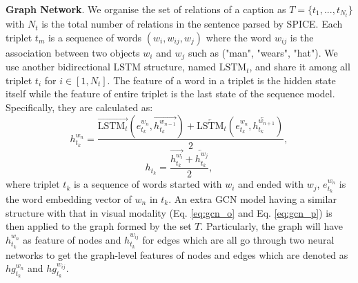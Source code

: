 \documentclass{IOS-Book-Article}
\begin{document}
\textbf{Graph Network}. We organise the set of relations of a caption as $T = \{t_1, ..., t_{N_t}\}$ with $N_t$ is the total number of relations in the sentence parsed by SPICE. Each triplet $t_m$ is a sequence of words $(w_i, w_{ij}, w_j)$ where the word $w_{ij}$ is the association between two objects $w_i$ and $w_j$ such as ("man", "wears", "hat"). We use another bidirectional LSTM structure, named $\text{LSTM}_t$, and share it among all triplet $t_i$ for $i \in [1, N_t]$. The feature of a word in a triplet is the hidden state itself while the feature of entire triplet is the last state of the sequence model. Specifically, they are calculated as: 
\begin{equation}
    h^{w_n}_{t_k} = \frac{\overrightarrow{\text{LSTM}_t}(e^{w_n}_{t_k}, \overrightarrow{h^{w_{n-1}}_{t_k}})
    + \overleftarrow{\text{LSTM}_t}(e^{w_n}_{t_k}, \overleftarrow{h^{w_{n+1}}_{t_k}})}{2},
\end{equation}
\begin{equation}
    h_{t_k} = \frac{\overrightarrow{h^{w_{i}}_{t_k}}+\overleftarrow{h^{w_{j}}_{t_k}}}{2},
\end{equation}
where triplet $t_k$ is a sequence of words started with $w_i$ and ended with $w_j$, $e^{w_n}_{t_k}$ is the word embedding vector of $w_n$ in $t_k$. An extra GCN model having a similar structure with that in visual modality (Eq. \ref{eq:gcn_o} and Eq. \ref{eq:gcn_p}) is then applied to the graph formed by the set $T$. Particularly, the graph will have $h^{w_n}_{t_k}$ as feature of nodes and $h^{w_{ij}}_{t_k}$ for edges which are all go through two neural networks to get the graph-level features of nodes and edges which are denoted as $hg^{w_n}_{t_k}$ and $hg^{w_{ij}}_{t_k}$.
\end{document}
